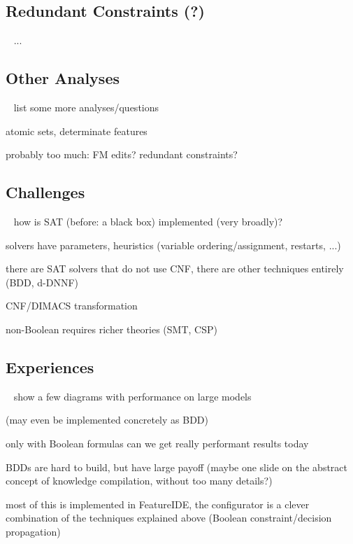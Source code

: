 \subsection{Redundant Constraints (?)}
\begin{frame}{~}
    ... %
\end{frame}

\subsection{Other Analyses}
\begin{frame}{~}
    list some more analyses/questions

    atomic sets, determinate features

    probably too much:
    FM edits?
    redundant constraints?
\end{frame}

\subsection{Challenges}
\begin{frame}{~}
    how is SAT (before: a black box) implemented (very broadly)?

    solvers have parameters, heuristics (variable ordering/assignment, restarts, ...)

    there are SAT solvers that do not use CNF, there are other techniques entirely (BDD, d-DNNF)

    CNF/DIMACS transformation

    non-Boolean requires richer theories (SMT, CSP)
\end{frame}

\subsection{Experiences} %
\begin{frame}{~}
    show a few diagrams with performance on large models

    (may even be implemented concretely as BDD)

    only with Boolean formulas can we get really performant results today

    BDDs are hard to build, but have large payoff (maybe one slide on the abstract concept of knowledge compilation, without too many details?)

    most of this is implemented in FeatureIDE, the configurator is a clever combination of the techniques explained above (Boolean constraint/decision propagation)
\end{frame}